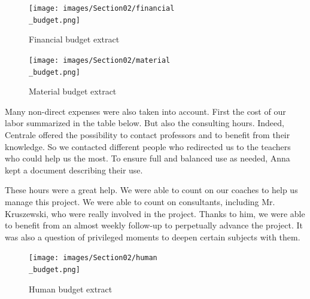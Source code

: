 \begin{figure}[ht]
    \centering
    \texttt{[image: images/Section02/financial\\\_budget.png]}
    \caption{Financial budget extract}
    \label{fig:mesh7}
\end{figure}
\FloatBarrier

\begin{figure}[ht]
    \centering
    \texttt{[image: images/Section02/material\\\_budget.png]}
    \caption{Material budget extract}
    \label{fig:mesh8}
\end{figure}
\FloatBarrier
Many non-direct expenses were also taken into account. First the cost of our labor summarized in the table below. But also the consulting hours. Indeed, Centrale offered the possibility to contact professors and to benefit from their knowledge. So we contacted different people who redirected us to the teachers who could help us the most. To ensure full and balanced use as needed, Anna kept a document describing their use. 

\bigbreak
These hours were a great help. We were able to count on our coaches to help us manage this project. We were able to count on consultants, including Mr. Kruszewski, who were really involved in the project. Thanks to him, we were able to benefit from an almost weekly follow-up to perpetually advance the project. It was also a question of privileged moments to deepen certain subjects with them.

\begin{figure}[ht]
    \centering
    \texttt{[image: images/Section02/human\\\_budget.png]}
    \caption{Human budget extract}
    \label{fig:mesh9}
\end{figure}